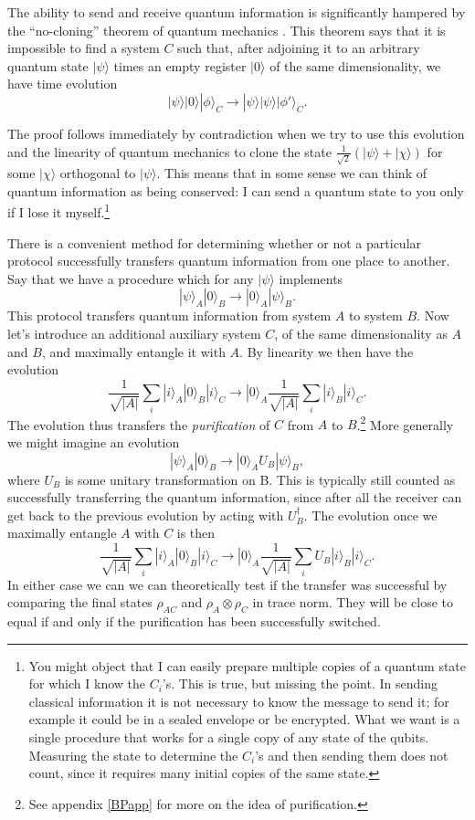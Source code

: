\documentclass[12pt]{article}
\newcommand{\be}{\begin{equation}}
\newcommand{\ee}{\end{equation}}
\newcommand{\ran}{\rangle}
\begin{document}
The ability to send and receive quantum information is significantly hampered by the ``no-cloning'' theorem of quantum mechanics \cite{Wootters:1982zz,Dieks:1982dj}.  This theorem says that it is impossible to find a system $C$ such that, after adjoining it to an arbitrary quantum state $|\psi\ran$ times an empty register $|0\ran$ of the same dimensionality,  we have time evolution
\be
|\psi\ran|0\ran|\phi\ran_C\to |\psi\ran|\psi\ran |\phi'\ran_C.
\ee

The proof follows immediately by contradiction when we try to use this evolution and the linearity of quantum mechanics to clone the state $\frac{1}{\sqrt{2}}(|\psi\ran+|\chi\ran)$ for some $|\chi\ran$ orthogonal to $|\psi\ran$.  This means that in some sense we can think of quantum information as being conserved: I can send a quantum state to you only if I lose it myself.\footnote{You might object that I can easily prepare multiple copies of a quantum state for which I know the $C_i$'s.  This is true, but missing the point.  In sending classical information it is not necessary to know the message to send it; for example it could be in a sealed envelope or be encrypted.  What we want is a single procedure that works for a single copy of any state of the qubits.  Measuring the state to determine the $C_i$'s and then sending them does not count, since it requires many initial copies of the same state.}  

There is a convenient method for determining whether or not a particular protocol successfully transfers quantum information from one place to another.  Say that we have a procedure which for any $|\psi\ran$ implements
\be
|\psi\ran_A |0\ran_B\to |0\ran_A|\psi\ran_B.  
\ee
This protocol transfers quantum information from system $A$ to system $B$.  Now let's introduce an additional auxiliary system $C$, of the same dimensionality as $A$ and $B$, and maximally entangle it with $A$.  By linearity we then have the evolution
\be
\frac{1}{\sqrt{|A|}}\sum_i |i\ran_A |0\ran_B |i\ran_C\to |0\ran_A \frac{1}{\sqrt{|A|}}\sum_i |i\ran_B |i\ran_C.
\ee
The evolution thus transfers the \textit{purification} of $C$ from $A$ to $B$.\footnote{See appendix \ref{BPapp} for more on the idea of purification.}  More generally we might imagine an evolution
\be\label{infoU}
|\psi\ran_A |0\ran_B\to |0\ran_AU_B|\psi\ran_B,  
\ee
where $U_B$ is some unitary transformation on B.  This is typically still counted as successfully transferring the quantum information, since after all the receiver can get back to the previous evolution by acting with $U_B^\dagger$.  The evolution once we maximally entangle $A$ with $C$ is then
\be
\frac{1}{\sqrt{|A|}}\sum_i |i\ran_A |0\ran_B |i\ran_C\to |0\ran_A \frac{1}{\sqrt{|A|}}\sum_i U_B|i\ran_B |i\ran_C.
\ee
In either case we can we can theoretically test if the transfer was successful by comparing the final states $\rho_{AC}$ and $\rho_A\otimes\rho_C$ in trace norm.  They will be close to equal if and only if the purification has been successfully switched.
\end{document}
